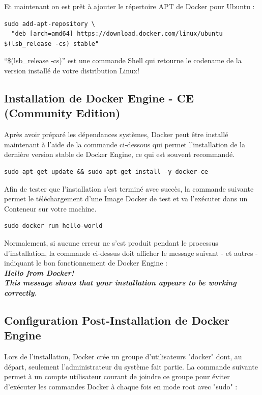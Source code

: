\documentclass[a4paper,11pt,oneside]{report}
\begin{document}
\begin{appendices}
Et maintenant on est prêt à ajouter le répertoire APT de Docker pour Ubuntu :
\begin{verbatim}
sudo add-apt-repository \
  "deb [arch=amd64] https://download.docker.com/linux/ubuntu $(lsb_release -cs) stable"
\end{verbatim}
``\$(lsb\_release -cs)'' est une commande Shell qui retourne le codename de la version installé de votre distribution Linux!
\subsection{Installation de Docker Engine - CE (Community Edition)}

Après avoir préparé les dépendances systèmes, Docker peut être installé maintenant à l'aide de la commande ci-dessous qui permet l'installation de la dernière version stable de Docker Engine, ce qui est souvent recommandé.
\begin{verbatim}
sudo apt-get update && sudo apt-get install -y docker-ce
\end{verbatim}

Afin de tester que l'installation s'est terminé avec succès, la commande suivante permet le téléchargement d'une Image Docker de test et va l'exécuter dans un Conteneur sur votre machine. 
\begin{verbatim}
sudo docker run hello-world
\end{verbatim}

Normalement, si aucune erreur ne s'est produit pendant le processus d'installation, la commande ci-dessus doit afficher le message suivant - et autres - indiquant le bon fonctionnement de Docker Engine :
\newline
{\scriptsize
  \emph{
    \textbf{\\
    Hello from Docker!\\
    This message shows that your installation appears to be working correctly.
    }
  }
}

\subsection{Configuration Post-Installation de Docker Engine}

Lors de l'installation, Docker crée un groupe d'utilisateurs "docker" dont, au départ, seulement l'administrateur du système fait partie. La commande suivante permet à un compte utilisateur courant de joindre ce groupe pour éviter d'exécuter les commandes Docker à chaque fois en mode root avec "sudo" :


\end{appendices}
\end{document}
